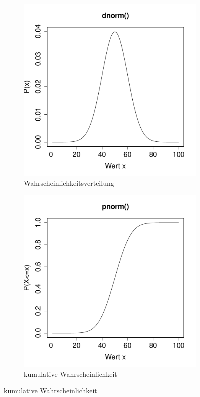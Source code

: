 \begin{figure}[h!]
\centering
\begin{subfigure}[b]{0.48\textwidth}
\includegraphics{verteilungen-073}
\caption{Wahrscheinlichkeitsverteilung}
\end{subfigure}
\begin{subfigure}[b]{0.48\textwidth}
\includegraphics{verteilungen-074}
\caption{kumulative Wahrscheinlichkeit}
\end{subfigure}


\end{figure}
